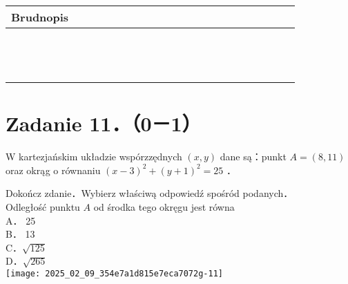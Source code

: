 \documentclass[10pt]{article}
\begin{document}
\begin{center}
\begin{tabular}{|c|c|c|c|c|c|c|c|c|c|c|c|c|c|c|c|c|c|c|c|c|c|c|c|}
\hline
\multicolumn{4}{|l|}{Brudnopis} &  &  &  &  &  &  &  &  &  &  &  &  &  &  &  &  &  &  &  &  \\
\hline
 &  &  &  &  &  &  &  &  &  &  &  &  &  &  &  &  &  &  &  &  &  &  &  \\
\hline
 &  &  &  &  &  &  &  &  &  &  &  &  &  &  &  &  &  &  &  &  &  &  &  \\
\hline
 &  &  &  &  &  &  &  &  &  &  &  &  &  &  &  &  &  &  &  &  &  &  &  \\
\hline
 &  &  &  &  &  &  &  &  &  &  &  &  &  &  &  &  &  &  &  &  &  &  &  \\
\hline
 &  &  &  &  &  &  &  &  &  &  &  &  &  &  &  &  &  &  &  &  &  &  &  \\
\hline
 &  &  &  &  &  &  &  &  &  &  &  &  &  &  &  &  &  &  &  &  &  &  &  \\
\hline
 &  &  &  &  &  &  &  &  &  &  &  &  &  &  &  &  &  &  &  &  &  &  &  \\
\hline
 &  &  &  &  &  &  &  &  &  &  &  &  &  &  &  &  &  &  &  &  &  &  &  \\
\hline
 &  &  &  &  &  &  &  &  &  &  &  &  &  &  &  &  &  &  &  &  &  &  &  \\
\hline
 &  &  &  &  &  &  &  &  &  &  &  &  &  &  &  &  &  &  &  &  &  &  &  \\
\hline
 &  &  &  &  &  &  &  &  &  &  &  &  &  &  &  &  &  &  &  &  &  &  &  \\
\hline
 &  &  &  &  &  &  &  &  &  &  &  &  &  &  &  &  &  &  &  &  &  &  &  \\
\hline
 &  &  &  &  &  &  &  &  &  &  &  &  &  &  &  &  &  &  &  &  &  &  &  \\
\hline
\end{tabular}
\end{center}

\section*{Zadanie 11．（0－1）}
W kartezjańskim układzie wspórzzędnych \((x, y)\) dane są：punkt \(A=(8,11)\) oraz okrąg o równaniu \((x-3)^{2}+(y+1)^{2}=25\) ．

Dokończ zdanie．Wybierz właściwą odpowiedź spośród podanych．\\
Odległość punktu \(A\) od środka tego okręgu jest równa\\
A． 25\\
B． 13\\
C．\(\sqrt{125}\)\\
D．\(\sqrt{265}\)\\
\texttt{[image: 2025\_02\_09\_354e7a1d815e7eca7072g-11]}
\end{document}
